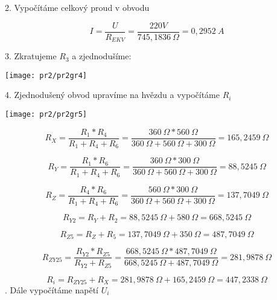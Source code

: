 \documentclass[a4paper,12pt]{article}
\begin{document}
2. Vypočítáme celkový proud v obvodu

\begin{equation*}
I = \frac{U}{R_{EKV}} = \frac{220 V}{745,1836\ \Omega} = 0,2952\ A
\end{equation*}

3. Zkratujeme $R_3$ a zjednodušíme:

\begin{center}
\texttt{[image: pr2/pr2gr4]}
\end{center}

4. Zjednodušený obvod upravíme na hvězdu a vypočítáme $R_i$

\begin{center}
\texttt{[image: pr2/pr2gr5]}
\end{center}

\begin{equation*}
R_X = \frac{R_1*R_4}{R_1+R_4+R_6} = \frac{360\ \Omega * 560\ \Omega}{360\ \Omega + 560\ \Omega + 300\ \Omega} = 165,2459\ \Omega
\end{equation*}

\begin{equation*}
R_Y = \frac{R_1*R_6}{R_1+R_4+R_6} = \frac{360\ \Omega * 300\ \Omega}{360\ \Omega + 560\ \Omega + 300\ \Omega} = 88,5245\ \Omega
\end{equation*}

\begin{equation*}
R_Z = \frac{R_4*R_6}{R_1+R_4+R_6} = \frac{560\ \Omega * 300\ \Omega}{360\ \Omega + 560\ \Omega + 300\ \Omega} = 137,7049\ \Omega
\end{equation*}

\begin{equation*}
R_{Y2} = R_Y + R_2 = 88,5245\ \Omega + 580\ \Omega = 668,5245\ \Omega
\end{equation*}

\begin{equation*}
R_{Z5} = R_Z + R_5 =  137,7049\ \Omega + 350\ \Omega = 487,7049\ \Omega
\end{equation*}

\begin{equation*}
R_{ZY25} = \frac{R_{Y2}*R_{Z5}}{R_{Y2}+R_{Z5}} = \frac{668,5245\ \Omega*487,7049\ \Omega}{668,5245\ \Omega + 487,7049\ \Omega} = 281,9878\ \Omega
\end{equation*}

\begin{equation*}
R_{i} = R_{ZY25} + R_X =  281,9878\ \Omega + 165,2459\ \Omega = 447,2338\ \Omega
\end{equation*}
. Dále vypočítáme napětí $U_i$ 
\end{document}
